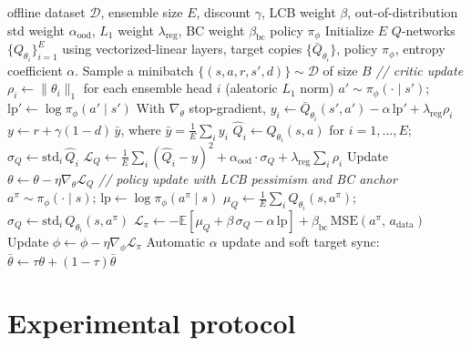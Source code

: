 \documentclass[journal,10pt]{IEEEtran}
\begin{document}
\begin{algorithm}[!htbp]
\caption{RE-SAC offline training}
\label{alg:resac}
\begin{algorithmic}[1]
\REQUIRE offline dataset $\mathcal{D}$, ensemble size $E$, discount $\gamma$, LCB weight $\beta$, out-of-distribution std weight $\alpha_{\text{ood}}$, $L_1$ weight $\lambda_{\text{reg}}$, BC weight $\beta_{\text{bc}}$
\ENSURE policy $\pi_\phi$
\STATE Initialize $E$ $Q$-networks $\{Q_{\theta_i}\}_{i=1}^{E}$ using vectorized-linear layers, target copies $\{\bar Q_{\theta_i}\}$, policy $\pi_\phi$, entropy coefficient $\alpha$.
    \STATE Sample a minibatch $\{(s, a, r, s', d)\} \sim \mathcal{D}$ of size $B$
    \STATE \textit{// critic update}
    \STATE $\rho_i \leftarrow \|\theta_i\|_1$ for each ensemble head $i$  (aleatoric $L_1$ norm)
    \STATE $a' \sim \pi_\phi(\cdot \mid s')$; \quad $\mathrm{lp}' \leftarrow \log\pi_\phi(a' \mid s')$
    \STATE With $\nabla_\theta$ stop-gradient, $y_i \leftarrow \bar Q_{\theta_i}(s', a') - \alpha\,\mathrm{lp}' + \lambda_{\text{reg}}\rho_i$
    \STATE $y \leftarrow r + \gamma(1-d)\,\bar y$, where $\bar y = \tfrac{1}{E}\sum_i y_i$
    \STATE $\widehat Q_i \leftarrow Q_{\theta_i}(s, a)$ for $i=1,\ldots,E$; \quad $\sigma_Q \leftarrow \mathrm{std}_i\,\widehat Q_i$
    \STATE $\mathcal{L}_Q \leftarrow \tfrac{1}{E}\sum_i (\widehat Q_i - y)^2 + \alpha_{\text{ood}}\cdot\sigma_Q + \lambda_{\text{reg}}\sum_i \rho_i$
    \STATE Update $\theta \leftarrow \theta - \eta \nabla_\theta \mathcal{L}_Q$
    \STATE \textit{// policy update with LCB pessimism and BC anchor}
    \STATE $a^\pi \sim \pi_\phi(\cdot \mid s)$; \quad $\mathrm{lp} \leftarrow \log\pi_\phi(a^\pi \mid s)$
    \STATE $\mu_Q \leftarrow \tfrac{1}{E}\sum_i Q_{\theta_i}(s, a^\pi)$;\quad $\sigma_Q \leftarrow \mathrm{std}_i\,Q_{\theta_i}(s, a^\pi)$
    \STATE $\mathcal{L}_\pi \leftarrow -\mathbb{E}[\mu_Q + \beta\,\sigma_Q - \alpha\,\mathrm{lp}] + \beta_{\text{bc}}\,\mathrm{MSE}(a^\pi,\, a_{\text{data}})$
    \STATE Update $\phi \leftarrow \phi - \eta \nabla_\phi \mathcal{L}_\pi$
    \STATE Automatic $\alpha$ update and soft target sync: $\bar\theta \leftarrow \tau\theta + (1-\tau)\bar\theta$
\ENDFOR
\end{algorithmic}
\end{algorithm}

\section{Experimental protocol}
\label{sec:protocol}
\end{document}
